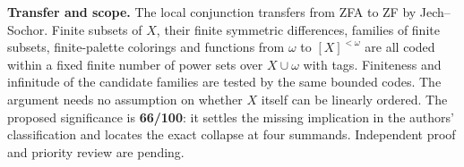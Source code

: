 \documentclass[11pt]{article}
\begin{document}
\textbf{Transfer and scope.} The local conjunction transfers from ZFA to ZF by Jech--Sochor. Finite subsets of \(X\), their finite symmetric differences, families of finite subsets, finite-palette colorings and functions from \(\omega\) to \([X]^{<\omega}\) are all coded within a fixed finite number of power sets over \(X\cup\omega\) with tags. Finiteness and infinitude of the candidate families are tested by the same bounded codes. The argument needs no assumption on whether \(X\) itself can be linearly ordered. The proposed significance is \textbf{66/100}: it settles the missing implication in the authors' classification and locates the exact collapse at four summands. Independent proof and priority review are pending.
\end{document}
